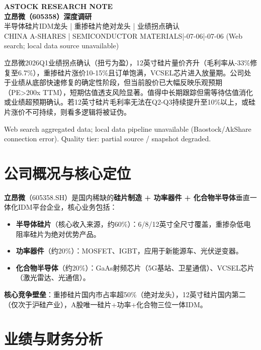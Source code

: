 \documentclass[a4paper,11pt,fontset=none]{ctexart}
\newcommand{\reporttitle}{立昂微（605358）深度调研}
\newcommand{\reportsubtitle}{半导体硅片IDM龙头 | 重掺硅片绝对龙头 | 业绩拐点确认}
\newcommand{\reportkicker}{ASTOCK RESEARCH NOTE}
\newcommand{\reportscope}{CHINA A-SHARES | SEMICONDUCTOR MATERIALS}
\newcommand{\reportdate}{2026-07-06}
\newcommand{\reportdatacutoff}{2026-07-06 (Web search; local data source unavailable)}
\newcommand{\reporthouseview}{%
立昂微2026Q1业绩拐点确认（扭亏为盈），12英寸硅片量价齐升（毛利率从-33\%修复至6.7\%），重掺硅片涨价10-15\%且订单饱满，VCSEL芯片进入放量期。公司处于业绩从底部快速修复的确定性阶段，但当前股价已大幅反映乐观预期（PE>200x TTM），短期估值透支风险显著。值得中长期跟踪但需等待估值消化或业绩超预期确认。若12英寸硅片毛利率无法在Q2-Q3持续提升至10\%以上，或硅片涨价不可持续，则看多逻辑将被证伪。%
}
\newcommand{\reportquality}{Web search aggregated data; local data pipeline unavailable (Baostock/AkShare connection error). Quality tier: partial source / snapshot degraded.}
\begin{document}
\begin{center}
{\sffamily\small\bfseries\color{steelgrey} \reportkicker}\\[3pt]
{\LARGE\bfseries\color{navy} \reporttitle}\\[5pt]
{\large\color{steelgrey} \reportsubtitle}\\[4pt]
{\small\color{mutedgrey} \reportscope \quad|\quad \reportdate \quad|\quad \reportdatacutoff}
\end{center}
\vspace{0.7em}

\begin{dashboardbox}
\begin{houseviewbox}
\reporthouseview
\end{houseviewbox}
\begin{sourcequalitybox}
\reportquality
\end{sourcequalitybox}
\end{dashboardbox}

\section{公司概况与核心定位}

\textbf{立昂微}（605358.SH）是国内稀缺的\textbf{硅片制造 + 功率器件 + 化合物半导体}垂直一体化IDM平台企业，核心业务包括：

\begin{itemize}
  \item \textbf{半导体硅片}（核心收入来源，约60\%）：6/8/12英寸全尺寸覆盖，重掺杂低电阻率硅片为绝对优势产品。
  \item \textbf{功率器件}（约20\%）：MOSFET、IGBT，应用于新能源车、光伏逆变器。
  \item \textbf{化合物半导体}（约20\%）：GaAs射频芯片（5G基站、卫星通信）、VCSEL芯片（激光雷达、光通信）。
\end{itemize}

\textbf{核心竞争壁垒}：重掺硅片国内市占率超50\%（绝对龙头），12英寸硅片国内第二（仅次于沪硅产业），A股唯一硅片+功率+化合物三位一体IDM。

\section{业绩与财务分析}
\end{document}
